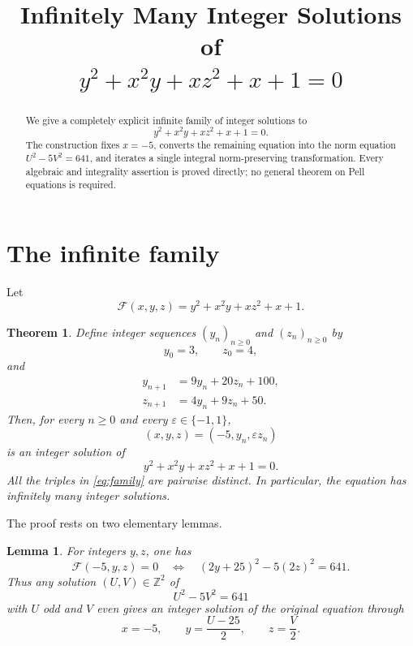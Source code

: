 \documentclass[11pt]{article}
\title{Infinitely Many Integer Solutions of\\[2pt]
\texorpdfstring{$y^2+x^2y+xz^2+x+1=0$}{y^2+x^2y+xz^2+x+1=0}}
\author{}
\date{}
\newtheorem{theorem}{Theorem}
\newtheorem{lemma}{Lemma}
\theoremstyle{remark}
\newcommand{\Z}{\mathbb Z}
\newcommand{\F}{\mathcal F}
\begin{document}
\maketitle
\vspace{-2.0em}

\begin{abstract}
We give a completely explicit infinite family of integer solutions to
\[
 y^2+x^2y+xz^2+x+1=0.
\]
The construction fixes $x=-5$, converts the remaining equation into the norm equation
$U^2-5V^2=641$, and iterates a single integral norm-preserving transformation.  Every
algebraic and integrality assertion is proved directly; no general theorem on Pell
equations is required.
\end{abstract}

\section{The infinite family}

Let
\[
\F(x,y,z)=y^2+x^2y+xz^2+x+1.
\]

\begin{theorem}\label{thm:main}
Define integer sequences $(y_n)_{n\ge 0}$ and $(z_n)_{n\ge 0}$ by
\[
 y_0=3,\qquad z_0=4,
\]
and
\begin{equation}\label{eq:yzrec}
\boxed{
\begin{aligned}
 y_{n+1}&=9y_n+20z_n+100,\\
 z_{n+1}&=4y_n+9z_n+50.
\end{aligned}}
\end{equation}
Then, for every $n\ge 0$ and every $\varepsilon\in\{-1,1\}$,
\begin{equation}\label{eq:family}
 \boxed{(x,y,z)=(-5,y_n,\varepsilon z_n)}
\end{equation}
is an integer solution of
\[
 y^2+x^2y+xz^2+x+1=0.
\]
All the triples in \eqref{eq:family} are pairwise distinct.  In particular, the
equation has infinitely many integer solutions.
\end{theorem}

The proof rests on two elementary lemmas.

\begin{lemma}\label{lem:change}
For integers $y,z$, one has
\[
 \F(-5,y,z)=0
 \quad\Longleftrightarrow\quad
 (2y+25)^2-5(2z)^2=641.
\]
Thus any solution $(U,V)\in\Z^2$ of
\begin{equation}\label{eq:norm}
 U^2-5V^2=641
\end{equation}
with $U$ odd and $V$ even gives an integer solution of the original equation through
\begin{equation}\label{eq:back}
 x=-5,\qquad y=\frac{U-25}{2},\qquad z=\frac V2.
\end{equation}
\end{lemma}
\end{document}
